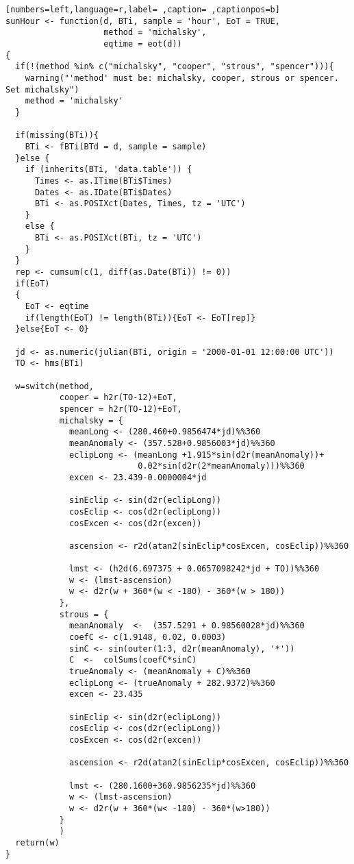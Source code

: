 \begin{lstlisting}[numbers=left,language=r,label= ,caption= ,captionpos=b]
sunHour <- function(d, BTi, sample = 'hour', EoT = TRUE,
                    method = 'michalsky',
                    eqtime = eot(d))
{
  if(!(method %in% c("michalsky", "cooper", "strous", "spencer"))){
    warning("'method' must be: michalsky, cooper, strous or spencer.
Set michalsky")
    method = 'michalsky'
  }

  if(missing(BTi)){
    BTi <- fBTi(BTd = d, sample = sample)
  }else {
    if (inherits(BTi, 'data.table')) {
      Times <- as.ITime(BTi$Times)
      Dates <- as.IDate(BTi$Dates)
      BTi <- as.POSIXct(Dates, Times, tz = 'UTC')
    }
    else {
      BTi <- as.POSIXct(BTi, tz = 'UTC')
    }   
  }
  rep <- cumsum(c(1, diff(as.Date(BTi)) != 0))
  if(EoT)
  {
    EoT <- eqtime
    if(length(EoT) != length(BTi)){EoT <- EoT[rep]}
  }else{EoT <- 0}

  jd <- as.numeric(julian(BTi, origin = '2000-01-01 12:00:00 UTC'))
  TO <- hms(BTi)
  
  w=switch(method,
           cooper = h2r(TO-12)+EoT,
           spencer = h2r(TO-12)+EoT,
           michalsky = {
             meanLong <- (280.460+0.9856474*jd)%%360
             meanAnomaly <- (357.528+0.9856003*jd)%%360
             eclipLong <- (meanLong +1.915*sin(d2r(meanAnomaly))+
                           0.02*sin(d2r(2*meanAnomaly)))%%360
             excen <- 23.439-0.0000004*jd
             
             sinEclip <- sin(d2r(eclipLong))
             cosEclip <- cos(d2r(eclipLong))
             cosExcen <- cos(d2r(excen))
             
             ascension <- r2d(atan2(sinEclip*cosExcen, cosEclip))%%360

             lmst <- (h2d(6.697375 + 0.0657098242*jd + TO))%%360
             w <- (lmst-ascension)
             w <- d2r(w + 360*(w < -180) - 360*(w > 180))
           },
           strous = {
             meanAnomaly  <-  (357.5291 + 0.98560028*jd)%%360
             coefC <- c(1.9148, 0.02, 0.0003)
             sinC <- sin(outer(1:3, d2r(meanAnomaly), '*'))
             C  <-  colSums(coefC*sinC)
             trueAnomaly <- (meanAnomaly + C)%%360
             eclipLong <- (trueAnomaly + 282.9372)%%360
             excen <- 23.435
             
             sinEclip <- sin(d2r(eclipLong))
             cosEclip <- cos(d2r(eclipLong))
             cosExcen <- cos(d2r(excen))
             
             ascension <- r2d(atan2(sinEclip*cosExcen, cosEclip))%%360

             lmst <- (280.1600+360.9856235*jd)%%360
             w <- (lmst-ascension)
             w <- d2r(w + 360*(w< -180) - 360*(w>180))
           }
           )
  return(w)
}
\end{lstlisting}
